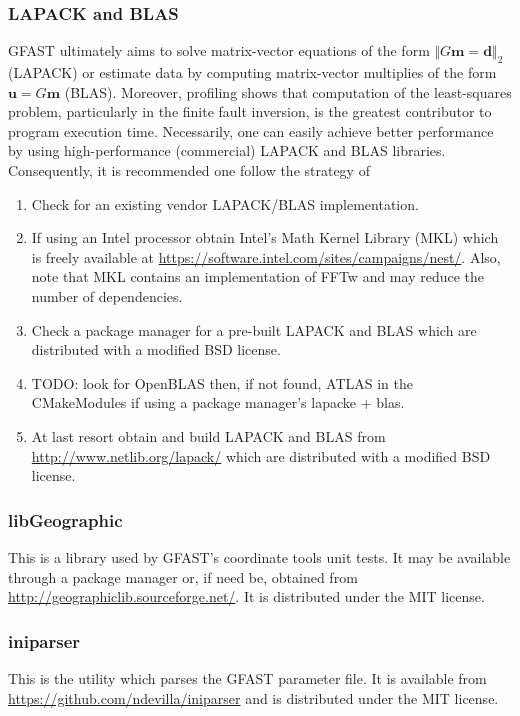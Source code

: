 \documentclass[12pt]{article}
\begin{document}
\subsubsection{LAPACK and BLAS} GFAST ultimately aims to solve matrix-vector
equations of the form $\Vert G \textbf{m} = \textbf{d}\Vert_2 $ (LAPACK) or estimate 
data by computing matrix-vector multiplies of the form $\textbf{u} = G \textbf{m}$ (BLAS).  
Moreover, profiling shows that computation of the least-squares problem, particularly in the
finite fault inversion, is the greatest contributor to program execution time.  
Necessarily, one can easily achieve better performance
by using high-performance (commercial) LAPACK and BLAS libraries.  Consequently, it is recommended one
follow the strategy of 
\begin{enumerate}
  \item Check for an existing vendor LAPACK/BLAS implementation.  
  \item If using an Intel processor obtain Intel's Math Kernel Library (MKL) 
        which is freely available at \url{https://software.intel.com/sites/campaigns/nest/}.
        Also, note that MKL contains an implementation of FFTw and may reduce the number of
        dependencies. 
  \item Check a package manager for a pre-built LAPACK and BLAS which are distributed with a
  modified BSD license.
  \item TODO: look for OpenBLAS then, if not found, ATLAS in the CMakeModules if using a 
  package manager's lapacke + blas.      
  \item At last resort obtain and build LAPACK and BLAS from \url{http://www.netlib.org/lapack/}
  which are distributed with a modified BSD license. 
\end{enumerate}

\subsubsection{libGeographic}
This is a library used by GFAST's coordinate tools unit tests.  It may be available through
a package manager or, if need be, obtained from \url{http://geographiclib.sourceforge.net/}.  It is
distributed under the MIT license. 

\subsubsection{iniparser}
This is the utility which parses the GFAST parameter file.  It is available from
\url{https://github.com/ndevilla/iniparser} and is distributed under the MIT license.
\end{document}
